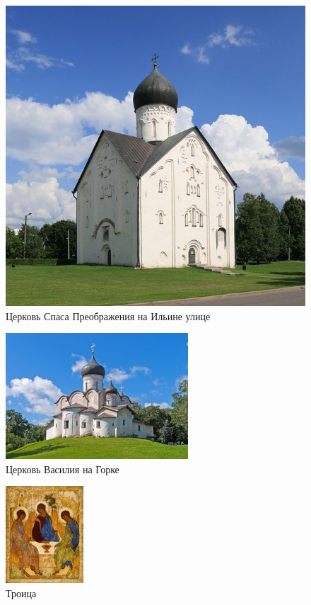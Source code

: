 
\begin{figure}[ht]
    \centering
    \includegraphics{img/rus/1.jpg}
    \caption{Церковь Спаса Преображения на Ильине улице}\label{fig:rus:1}
\end{figure}

\begin{figure}[ht]
    \centering
    \includegraphics{img/rus/2.jpg}
    \caption{Церковь Василия на Горке}\label{fig:rus:2}
\end{figure}

\begin{figure}[ht]
    \centering
    \includegraphics{img/rus/3.jpg}
    \caption{Троица}\label{fig:rus:3}
\end{figure}


